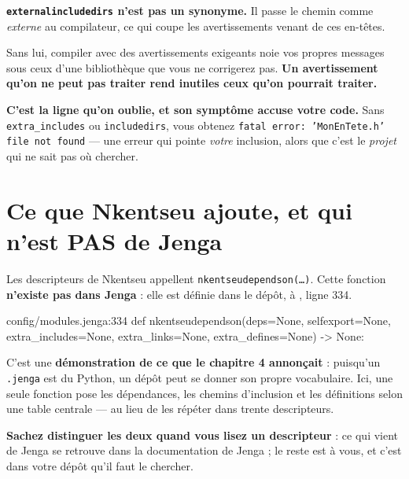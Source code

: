 \begin{nkretenir}
\textbf{\texttt{externalincludedirs} n'est pas un synonyme.} Il passe le chemin
comme \emph{externe} au compilateur, ce qui coupe les avertissements venant de
ces en-têtes.

Sans lui, compiler avec des avertissements exigeants noie vos propres messages
sous ceux d'une bibliothèque que vous ne corrigerez pas. \textbf{Un avertissement
qu'on ne peut pas traiter rend inutiles ceux qu'on pourrait traiter.}
\end{nkretenir}

\begin{nkpiege}
\textbf{C'est la ligne qu'on oublie, et son symptôme accuse votre code.}
Sans \texttt{extra\_includes} ou \texttt{includedirs}, vous obtenez
\texttt{fatal error: 'MonEnTete.h' file not found} --- une erreur qui pointe
\emph{votre} inclusion, alors que c'est le \emph{projet} qui ne sait pas où
chercher.
\end{nkpiege}

\section{Ce que Nkentseu ajoute, et qui n'est PAS de Jenga}

\begin{nkretenir}
Les descripteurs de Nkentseu appellent \texttt{nkentseudependson(\dots)}. Cette
fonction \textbf{n'existe pas dans Jenga} : elle est définie dans le dépôt, à
, ligne 334.

\begin{nkcode}{config/modules.jenga:334}
def nkentseudependson(deps=None, selfexport=None, extra_includes=None,
                      extra_links=None, extra_defines=None) -> None:
\end{nkcode}

C'est une \textbf{démonstration de ce que le chapitre 4 annonçait} : puisqu'un
\texttt{.jenga} est du Python, un dépôt peut se donner son propre vocabulaire.
Ici, une seule fonction pose les dépendances, les chemins d'inclusion et les
définitions selon une table centrale --- au lieu de les répéter dans trente
descripteurs.

\textbf{Sachez distinguer les deux quand vous lisez un descripteur} : ce qui vient
de Jenga se retrouve dans la documentation de Jenga ; le reste est à vous, et
c'est dans votre dépôt qu'il faut le chercher.
\end{nkretenir}

